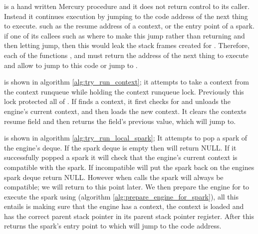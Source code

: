 \idle is a hand written Mercury procedure and it does not return control to
its caller.
Instead it continues execution by jumping to the code address of the next
thing to execute.
such as
the resume address of a context,
or the entry point of a spark.
if one of its callees such as \trystealspark where to make this jump rather
than returning and then letting \idle jump,
then this would leak the stack frames created for \trystealspark.
Therefore, each of the functions \tryrunlocalspark, \tryruncontext and
\trystealspark must return the address of the next thing to execute and
allow \idle to jump to this code or jump to \sleep.

\tryruncontext is shown in algorithm \ref{alg:try_run_context};
it attempts to take a context from the context runqueue while holding the
context runqueue lock.
Previously this lock protected all of \idle.
If \tryruncontext finds a context,
it first checks for and unloads the engine's current context,
and then loads the new context.
It clears the contexts resume field and then returns the field's previous
value, which \idle will jump to.

\tryrunlocalspark is shown in algorithm \ref{alg:try_run_local_spark};
It attempts to pop a spark of the engine's deque.
If the spark deque is empty then \tryrunlocalspark
will return NULL.
If it successfully popped a spark it will
check that the engine's current context is compatible with the spark.
If incompatible \tryrunlocalspark will put the spark back on the engines
spark deque return NULL.
However when \idle calls \tryrunlocalspark the spark will always be
compatible;
we will return to this point later.
We then prepare the engine for to execute the spark using
\prepareengineforspark
(algorithm \ref{alg:prepare_engine_for_spark}),
all this entails is making sure that the engine has a context, the context
is loaded and has the correct parent stack pointer in its parent stack
pointer register.
After this \tryrunlocalspark returns the spark's entry point to \idle which
will jump to the code address.

